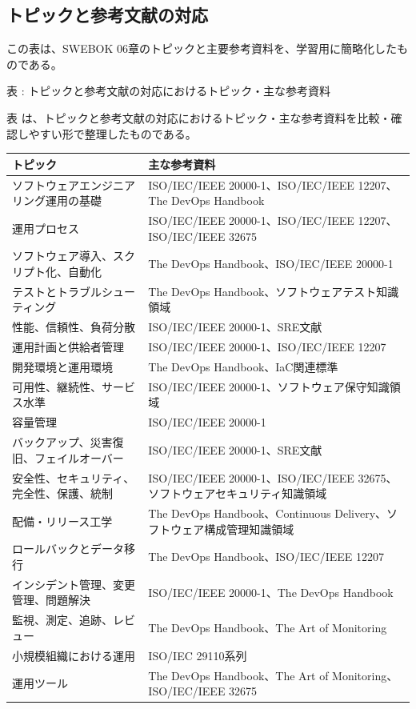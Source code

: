 \subsection{トピックと参考文献の対応}

この表は、SWEBOK 06章のトピックと主要参考資料を、学習用に簡略化したものである。

\par\smallskip\noindent{}\label{tab:ch06-08}表 \thetable: トピックと参考文献の対応におけるトピック・主な参考資料\par\smallskip
表 \thetable は、トピックと参考文献の対応におけるトピック・主な参考資料を比較・確認しやすい形で整理したものである。\par\smallskip
\begin{longtable}{L{70mm}L{80mm}}
\toprule
トピック & 主な参考資料 \\
\midrule
ソフトウェアエンジニアリング運用の基礎 & ISO/IEC/IEEE 20000-1、ISO/IEC/IEEE 12207、The DevOps Handbook \\
運用プロセス & ISO/IEC/IEEE 20000-1、ISO/IEC/IEEE 12207、ISO/IEC/IEEE 32675 \\
ソフトウェア導入、スクリプト化、自動化 & The DevOps Handbook、ISO/IEC/IEEE 20000-1 \\
テストとトラブルシューティング & The DevOps Handbook、ソフトウェアテスト知識領域 \\
性能、信頼性、負荷分散 & ISO/IEC/IEEE 20000-1、SRE文献 \\
運用計画と供給者管理 & ISO/IEC/IEEE 20000-1、ISO/IEC/IEEE 12207 \\
開発環境と運用環境 & The DevOps Handbook、IaC関連標準 \\
可用性、継続性、サービス水準 & ISO/IEC/IEEE 20000-1、ソフトウェア保守知識領域 \\
容量管理 & ISO/IEC/IEEE 20000-1 \\
バックアップ、災害復旧、フェイルオーバー & ISO/IEC/IEEE 20000-1、SRE文献 \\
安全性、セキュリティ、完全性、保護、統制 & ISO/IEC/IEEE 20000-1、ISO/IEC/IEEE 32675、ソフトウェアセキュリティ知識領域 \\
配備・リリース工学 & The DevOps Handbook、Continuous Delivery、ソフトウェア構成管理知識領域 \\
ロールバックとデータ移行 & The DevOps Handbook、ISO/IEC/IEEE 12207 \\
インシデント管理、変更管理、問題解決 & ISO/IEC/IEEE 20000-1、The DevOps Handbook \\
監視、測定、追跡、レビュー & The DevOps Handbook、The Art of Monitoring \\
小規模組織における運用 & ISO/IEC 29110系列 \\
運用ツール & The DevOps Handbook、The Art of Monitoring、ISO/IEC/IEEE 32675 \\
\bottomrule
\end{longtable}
